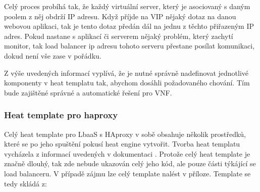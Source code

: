 Celý proces probíhá tak, že každý virtuální server, který je asociovaný s daným poolem z něj obdrží IP adresu. Když příjde na VIP nějaký dotaz na danou webovou aplikaci, tak je tento dotaz předán dál na jednu z těchto přiřazeným IP adres. Pokud nastane s aplikací či serverem nějaký problém, který zachytí monitor, tak load balancer ip adresu tohoto serveru přestane posílat komunikaci, dokud není vše zase v pořádku. 

Z výše uvedených informací vyplívá, že je nutné správně nadefinovat jednotlivé komponenty v heat templatu tak, abychom dosáhli požadovaného chování. Tím bude zajištěné správné a automatické řešení pro VNF.

\subsubsection{Heat template pro haproxy}

Celý heat template pro LbaaS s HAproxy v sobě obsahuje několik prostředků, které se po jeho spuštění pokusí heat engine vytvořit. Tvorba heat templatu vycházela z informací uvedených v dokumentaci \cite{HEAT}. Protože celý heat template je značně dlouhý, tak zde nebude ukazován celý jeho kód, ale pouze části týkájící se load balanceru. V případě zájmu lze celý template nalést v příloze. Template se tedy skládá z:

